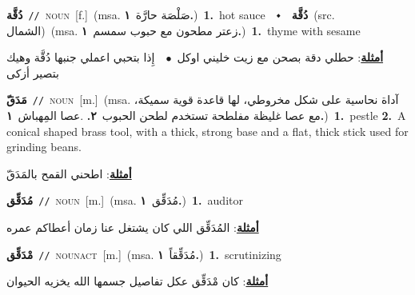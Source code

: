 \documentclass[10pt,a4paper,twoside]{article} %
\begin{document}
\begin{multicols}{2}
{\setlength\topsep{0pt}\textbf{\foreignlanguage{arabic}{دُقَّة}}\ {\color{gray}\texttt{//}\color{black}}\ \textsc{noun}\ [f.]\ \color{gray}(msa. \foreignlanguage{arabic}{صَلْصَة حارَّة}~\foreignlanguage{arabic}{\textbf{١.}})\color{black}\ \textbf{1.}~hot sauce\ \ $\smblkdiamond$\ \ \setlength\topsep{0pt}\textbf{\foreignlanguage{arabic}{دُقَّة}}\ (src. \color{gray}\foreignlanguage{arabic}{الشمال}\color{black})\ \color{gray}(msa. \foreignlanguage{arabic}{زعتر مطحون مع حبوب سمسم}~\foreignlanguage{arabic}{\textbf{١.}})\color{black}\ \textbf{1.}~thyme with sesame\  \begin{flushright}\color{gray}\foreignlanguage{arabic}{\textbf{\underline{\foreignlanguage{arabic}{أمثلة}}}: حطلي دقة بصحن مع زيت خليني اوكل\ $\bullet$\ \  إِذا بتحبي اعملي جنبها دُقَّة وهيك بتصير أزكى}\end{flushright}\color{black}} \vspace{2mm}

{\setlength\topsep{0pt}\textbf{\foreignlanguage{arabic}{مَدَقّ}}\ {\color{gray}\texttt{//}\color{black}}\ \textsc{noun}\ [m.]\ \color{gray}(msa. \foreignlanguage{arabic}{آداة نحاسية على شكل مخروطي، لها قاعدة قوية سميكة، مع عصا غليظة مفلطحة تستخدم لطحن الحبوب}~\foreignlanguage{arabic}{\textbf{٢.}}  .\foreignlanguage{arabic}{عصا المِهباش}~\foreignlanguage{arabic}{\textbf{١.}})\color{black}\ \textbf{1.}~pestle  \textbf{2.}~A conical shaped brass tool, with a thick, strong base and a flat, thick stick used for grinding beans.\  \begin{flushright}\color{gray}\foreignlanguage{arabic}{\textbf{\underline{\foreignlanguage{arabic}{أمثلة}}}: اطحني القمح بالمَدَقّ}\end{flushright}\color{black}} \vspace{2mm}

{\setlength\topsep{0pt}\textbf{\foreignlanguage{arabic}{مُدَقِّق}}\ {\color{gray}\texttt{//}\color{black}}\ \textsc{noun}\ [m.]\ \color{gray}(msa. \foreignlanguage{arabic}{مُدَقِّق}~\foreignlanguage{arabic}{\textbf{١.}})\color{black}\ \textbf{1.}~auditor\  \begin{flushright}\color{gray}\foreignlanguage{arabic}{\textbf{\underline{\foreignlanguage{arabic}{أمثلة}}}: المُدَقِّق اللي كان يشتغل عنا زمان أعطاكم عمره}\end{flushright}\color{black}} \vspace{2mm}

{\setlength\topsep{0pt}\textbf{\foreignlanguage{arabic}{مْدَقِّق}}\ {\color{gray}\texttt{//}\color{black}}\ \textsc{noun\textunderscore act}\ [m.]\ \color{gray}(msa. \foreignlanguage{arabic}{مُدَقِّقاً}~\foreignlanguage{arabic}{\textbf{١.}})\color{black}\ \textbf{1.}~scrutinizing\  \begin{flushright}\color{gray}\foreignlanguage{arabic}{\textbf{\underline{\foreignlanguage{arabic}{أمثلة}}}: كان مْدَقِّق عكل تفاصيل جسمها الله يخزيه الحيوان}\end{flushright}\color{black}} \vspace{2mm}


\end{multicols}
\end{document}
